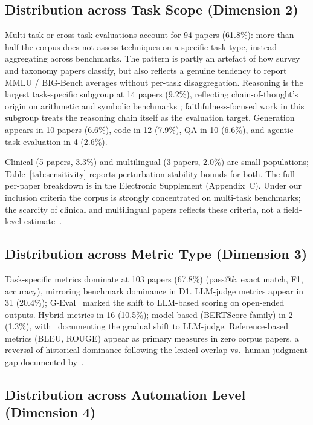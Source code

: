 \documentclass[acmsmall, nonacm, screen]{acmart}
\begin{document}
\subsection{Distribution across Task Scope (Dimension 2)}
\label{subsec:d2dist}

Multi-task or cross-task evaluations account for 94 papers (61.8\%):
more than half the corpus does not assess techniques on a specific
task type, instead aggregating across benchmarks. The pattern is
partly an artefact of how survey and taxonomy papers classify, but
also reflects a genuine tendency to report MMLU / BIG-Bench averages
without per-task disaggregation. Reasoning is the largest
task-specific subgroup at 14 papers (9.2\%), reflecting
chain-of-thought's origin on arithmetic and symbolic benchmarks
\cite{wei2022chain}; faithfulness-focused work in this subgroup
\cite{lanham2023faithfulness, chen2025reasoningmodels} treats the
reasoning chain itself as the evaluation target. Generation appears
in 10 papers (6.6\%), code in 12 (7.9\%), QA in 10 (6.6\%),
and agentic task evaluation in 4 (2.6\%).

Clinical (5 papers, 3.3\%) and multilingual (3 papers, 2.0\%) are
small populations; Table~\ref{tab:sensitivity} reports
perturbation-stability bounds for both. The full per-paper breakdown
is in the Electronic Supplement (Appendix~C). Under our inclusion
criteria the corpus is strongly concentrated on multi-task
benchmarks; the scarcity of clinical and multilingual papers reflects
these criteria, not a field-level estimate~\cite{clinicalnlp2024,
vatsal2024survey}.

\subsection{Distribution across Metric Type (Dimension 3)}
\label{subsec:d3dist}

Task-specific metrics dominate at 103 papers (67.8\%) (pass@$k$,
exact match, F1, accuracy), mirroring benchmark dominance in D1.
LLM-judge metrics appear in 31 (20.4\%); G-Eval~\cite{liu2023geval}
marked the shift to LLM-based scoring on open-ended outputs. Hybrid
metrics in 16 (10.5\%); model-based (BERTScore family) in 2 (1.3\%),
with~\cite{li2024leveraging} documenting the gradual shift to
LLM-judge. Reference-based metrics (BLEU, ROUGE) appear as primary
measures in zero corpus papers, a reversal of historical dominance
following the lexical-overlap vs.\ human-judgment gap documented
by~\cite{repairing2022}.

\subsection{Distribution across Automation Level (Dimension 4)}
\label{subsec:d4dist}
\end{document}
